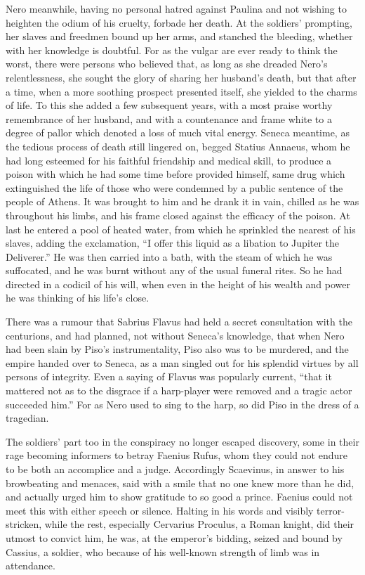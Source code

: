 Nero meanwhile, having no personal hatred against Paulina and not wishing to heighten the odium of his cruelty, forbade her death. At the soldiers' prompting, her slaves and freedmen bound up her arms, and stanched the bleeding, whether with her knowledge is doubtful. For as the vulgar are ever ready to think the worst, there were persons who believed that, as long as she dreaded Nero's relentlessness, she sought the glory of sharing her husband's death, but that after a time, when a more soothing prospect presented itself, she yielded to the charms of life. To this she added a few subsequent years, with a most praise worthy remembrance of her husband, and with a countenance and frame white to a degree of pallor which denoted a loss of much vital energy. Seneca meantime, as the tedious process of death still lingered on, begged Statius Annaeus, whom he had long esteemed for his faithful friendship and medical skill, to produce a poison with which he had some time before provided himself, same drug which extinguished the life of those who were condemned by a public sentence of the people of Athens. It was brought to him and he drank it in vain, chilled as he was throughout his limbs, and his frame closed against the efficacy of the poison. At last he entered a pool of heated water, from which he sprinkled the nearest of his slaves, adding the exclamation, ``I offer this liquid as a libation to Jupiter the Deliverer.'' He was then carried into a bath, with the steam of which he was suffocated, and he was burnt without any of the usual funeral rites. So he had directed in a codicil of his will, when even in the height of his wealth and power he was thinking of his life's close.


There was a rumour that Sabrius Flavus had held a secret consultation with the centurions, and had planned, not without Seneca's knowledge, that when Nero had been slain by Piso's instrumentality, Piso also was to be murdered, and the empire handed over to Seneca, as a man singled out for his splendid virtues by all persons of integrity. Even a saying of Flavus was popularly current, ``that it mattered not as to the disgrace if a harp-player were removed and a tragic actor succeeded him.'' For as Nero used to sing to the harp, so did Piso in the dress of a tragedian.


The soldiers' part too in the conspiracy no longer escaped discovery, some in their rage becoming informers to betray Faenius Rufus, whom they could not endure to be both an accomplice and a judge. Accordingly Scaevinus, in answer to his browbeating and menaces, said with a smile that no one knew more than he did, and actually urged him to show gratitude to so good a prince. Faenius could not meet this with either speech or silence. Halting in his words and visibly terror-stricken, while the rest, especially Cervarius Proculus, a Roman knight, did their utmost to convict him, he was, at the emperor's bidding, seized and bound by Cassius, a soldier, who because of his well-known strength of limb was in attendance.

